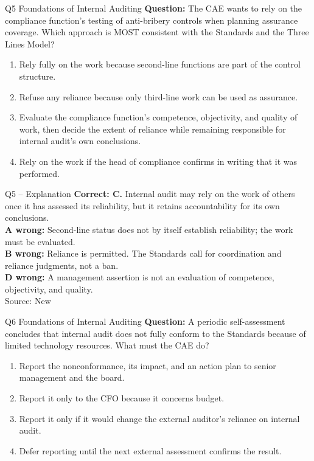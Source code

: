 \documentclass[aspectratio=169,10pt]{beamer}
\begin{document}
\begin{frame}[t]{Q5 \hfill {\scriptsize Foundations of Internal Auditing}}
	\small
	\textbf{Question:} The CAE wants to rely on the compliance function's testing of anti-bribery controls when planning assurance coverage. Which approach is MOST consistent with the Standards and the Three Lines Model?
	\begin{enumerate}[label=\Alph*.,itemsep=1pt,topsep=3pt]
			\item Rely fully on the work because second-line functions are part of the control structure.
			\item Refuse any reliance because only third-line work can be used as assurance.
			\item Evaluate the compliance function's competence, objectivity, and quality of work, then decide the extent of reliance while remaining responsible for internal audit's own conclusions.
			\item Rely on the work if the head of compliance confirms in writing that it was performed.
	\end{enumerate}
\end{frame}

\begin{frame}[t]{Q5 -- Explanation}
	\footnotesize
	\textbf{Correct: C.} Internal audit may rely on the work of others once it has assessed its reliability, but it retains accountability for its own conclusions. \\[5pt]
\textbf{A wrong:} Second-line status does not by itself establish reliability; the work must be evaluated. \\[3pt]
\textbf{B wrong:} Reliance is permitted. The Standards call for coordination and reliance judgments, not a ban. \\[3pt]
\textbf{D wrong:} A management assertion is not an evaluation of competence, objectivity, and quality. \\[3pt]
	\vfill {\tiny Source: New}
\end{frame}

\begin{frame}[t]{Q6 \hfill {\scriptsize Foundations of Internal Auditing}}
	\small
	\textbf{Question:} A periodic self-assessment concludes that internal audit does not fully conform to the Standards because of limited technology resources. What must the CAE do?
	\begin{enumerate}[label=\Alph*.,itemsep=1pt,topsep=3pt]
			\item Report the nonconformance, its impact, and an action plan to senior management and the board.
			\item Report it only to the CFO because it concerns budget.
			\item Report it only if it would change the external auditor's reliance on internal audit.
			\item Defer reporting until the next external assessment confirms the result.
	\end{enumerate}
\end{frame}
\end{document}
